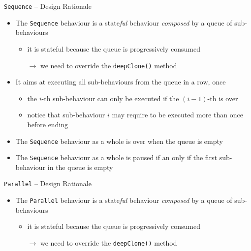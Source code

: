 \documentclass[presentation]{beamer}\mode<presentation>{\usetheme{AMSCesenaPurpleAndGold}}
\begin{document}
\begin{frame}[c, allowframebreaks]
    \begin{exampleblock}{\texttt{Sequence} -- Design Rationale}
        \begin{itemize}
            \item The \texttt{Sequence} behaviour is a \alert{state\emph{ful}} behaviour \emph{composed} by a \alert{queue} of sub-behaviours
            \begin{itemize}
                \item it is stateful because the queue is progressively consumed
                \item[$\rightarrow$] we need to override the \texttt{\alert{deepClone()}} method
            \end{itemize}

            \medskip

            \item It aims at executing all sub-behaviours from the queue \alert{in a row}, \alert{once}
            \begin{itemize}
                \item the $i$-th sub-behaviour can only be executed if the $(i-1)$-th is over
                \item notice that sub-behaviour $i$ may require to be executed more than once before ending
            \end{itemize}

            \medskip

            \item The \texttt{Sequence} behaviour as a whole is \alert{over} when the queue is empty

            \medskip

            \item The \texttt{Sequence} behaviour as a whole is \alert{paused} if an only if the first sub-behaviour in the queue is empty

        \end{itemize}
    \end{exampleblock}

    \begin{exampleblock}{\texttt{Parallel} -- Design Rationale}
        \begin{itemize}
            \item The \texttt{Parallel} behaviour is a \alert{state\emph{ful}} behaviour \emph{composed} by a \alert{queue} of sub-behaviours
            \begin{itemize}
                \item it is stateful because the queue is progressively consumed
                \item[$\rightarrow$] we need to override the \texttt{\alert{deepClone()}} method
            \end{itemize}


\end{itemize}
\end{exampleblock}
\end{frame}
\end{document}
